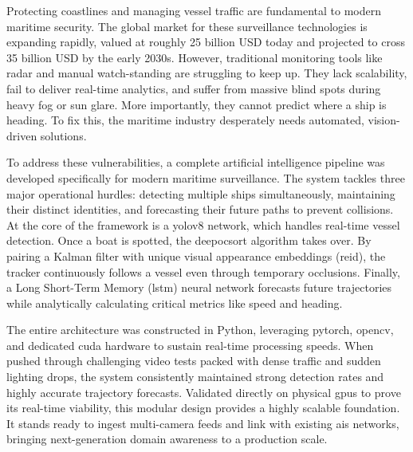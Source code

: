 \vspace{-1cm}
\thispagestyle{abstractpg}

Protecting coastlines and managing vessel traffic are fundamental to modern maritime security. The global market for these surveillance technologies is expanding rapidly, valued at roughly 25 billion USD today and projected to cross 35 billion USD by the early 2030s. However, traditional monitoring tools like radar and manual watch-standing are struggling to keep up. They lack scalability, fail to deliver real-time analytics, and suffer from massive blind spots during heavy fog or sun glare. More importantly, they cannot predict where a ship is heading. To fix this, the maritime industry desperately needs automated, vision-driven solutions.
 
To address these vulnerabilities, a complete artificial intelligence pipeline was developed specifically for modern maritime surveillance. The system tackles three major operational hurdles: detecting multiple ships simultaneously, maintaining their distinct identities, and forecasting their future paths to prevent collisions. At the core of the framework is a \gls{yolov8} network, which handles real-time vessel detection. Once a boat is spotted, the \gls{deepocsort} algorithm takes over. By pairing a Kalman filter with unique visual appearance embeddings (\gls{reid}), the tracker continuously follows a vessel even through temporary occlusions. Finally, a Long Short-Term Memory (\gls{lstm}) neural network forecasts future trajectories while analytically calculating critical metrics like speed and heading.

The entire architecture was constructed in Python, leveraging \gls{pytorch}, \gls{opencv}, and dedicated \gls{cuda} hardware to sustain real-time processing speeds. When pushed through challenging video tests packed with dense traffic and sudden lighting drops, the system consistently maintained strong detection rates and highly accurate trajectory forecasts. Validated directly on physical \glspl{gpu} to prove its real-time viability, this modular design provides a highly scalable foundation. It stands ready to ingest multi-camera feeds and link with existing \gls{ais} networks, bringing next-generation domain awareness to a production scale.

\pagebreak